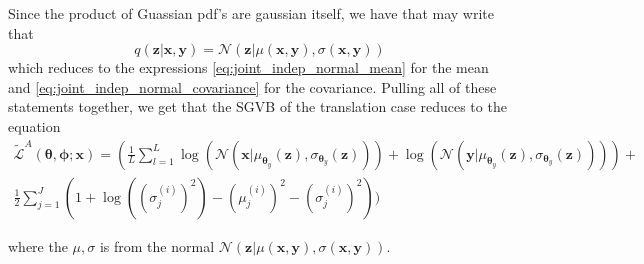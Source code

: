 Since the product of Guassian pdf's are gaussian itself, we have that may write
that
\begin{equation*}
  q(\bm{z} | \bm{x}, \bm{y}) = \mathcal{N}(\bm{z} | \mu(\bm{x}, \bm{y}), \sigma(\bm{x}, \bm{y}))
\end{equation*} which reduces to the expressions
\ref{eq:joint_indep_normal_mean} for the mean and
\ref{eq:joint_indep_normal_covariance} for the covariance.
Pulling all of these statements together, we get that the SGVB of the
translation case reduces to the equation
\begin{equation}
  \begin{split}
  \label{eq:translation_SGVB}
  \tilde{\mathcal{L}}^A(\bm{\theta}, \bm{\phi}; \bm{x}) = (\frac{1}{L} \sum_{l=1}^L \log(\mathcal{N}(\bm{x} | \mu_{\bm{\theta}_y}(\bm{z}), \sigma_{\bm{\theta}_y}(\bm{z}))) + \log(\mathcal{N}(\bm{y} | \mu_{\bm{\theta}_y}(\bm{z}), \sigma_{\bm{\theta}_y}(\bm{z})))) + \\ \frac{1}{2} \sum_{j=1}^J(1 + \log((\sigma_j^{(i)})^2) - (\mu_j^{(i)})^2 - (\sigma_j^{(i)})^2))
  \end{split}
\end{equation}

where the $\mu, \sigma$ is from the normal $\mathcal{N}(\bm{z} | \mu(\bm{x},
\bm{y}), \sigma(\bm{x}, \bm{y}))$.



